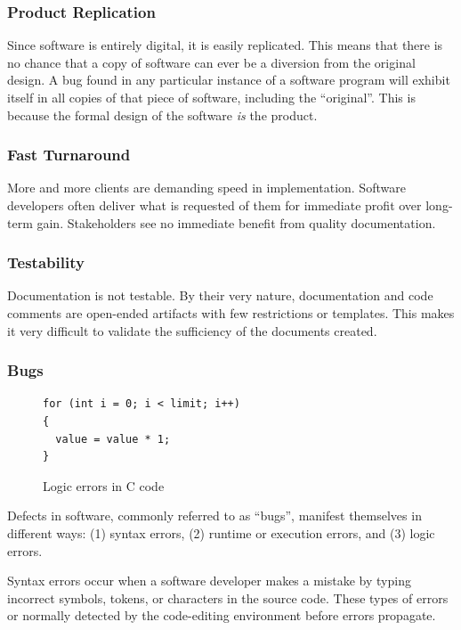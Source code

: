\subsubsection*{Product Replication}\label{software_product}
Since software is entirely digital, it is easily replicated. This means that
there is no chance that a copy of software can ever be a diversion from the
original design. A bug found in any particular instance of a software program
will exhibit itself in all copies of that piece of software, including the
``original''. This is because the formal design of the software \textit{is} the
product.

\subsubsection*{Fast Turnaround}

More and more clients are demanding speed in implementation. Software developers
often deliver what is requested of them for immediate profit over long-term
gain. Stakeholders see no immediate benefit from quality documentation.

\subsubsection*{Testability}

Documentation is not testable. By their very nature, documentation and code
comments are open-ended artifacts with few restrictions or templates. This makes
it very difficult to validate the sufficiency of the documents created.

\subsubsection*{Bugs}

\begin{figure}
\singlespacing
\makebox[\textwidth]{\hrulefill}
\begin{lstlisting}
for (int i = 0; i < limit; i++)
{
  value = value * 1;
}
\end{lstlisting}
\makebox[\textwidth]{\hrulefill}
\doublespacing
\caption{Logic errors in C code}
\label{fig:logic_bug}
\end{figure}

Defects in software, commonly referred to as ``bugs'', manifest themselves in
different ways: (1) syntax errors, (2) runtime or execution errors, and (3)
logic errors.

Syntax errors occur when a software developer makes a mistake by 
typing incorrect symbols, tokens, or characters in the source code. These types
of errors or normally detected by the code-editing environment before errors
propagate.

